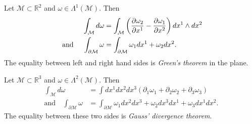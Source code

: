 \begin{example}[]
  Let $\mathcal{M} \subset \mathbb{R}^2$ and $\omega \in \Lambda^1(\mathcal{M})$. Then
  \begin{align}
    \int_{\mathcal{M}} d\omega &= \int_{\mathcal{M}} \left( \pdv{\omega_2}{x^1} - \pdv{\omega_1}{x^2} \right) dx^1 \wedge dx^2 \\
    \text{ and } \quad \int_{\partial \mathcal{M}} \omega &= \int_{\partial \mathcal{M}} \omega_1 dx^1 + \omega_2 dx^2.
  \end{align}
  The equality between left and right hand sides is \emph{Green's theorem} in the plane.
\end{example}

\begin{example}[]
  Let $\mathcal{M} \subset \mathbb{R}^3$ and $\omega \in \Lambda^2 (\mathcal{M})$. Then 
  \begin{align}
    \int_{\mathcal{M}} d\omega &= \int dx^1 dx^2 dx^3 \left( \partial_1 \omega_1 + \partial_2 \omega_2 + \partial_3 \omega_3 \right) \\
    \text{and} \quad \int_{\partial \mathcal{M}} \omega &= \int_{\partial \mathcal{M}} \omega_1 dx^2 dx^3 + \omega_2 dx^3 dx^1 + \omega_3 dx^1 dx^2.
  \end{align}
  The equality between these two sides is \emph{Gauss' divergence theorem}.
\end{example}
